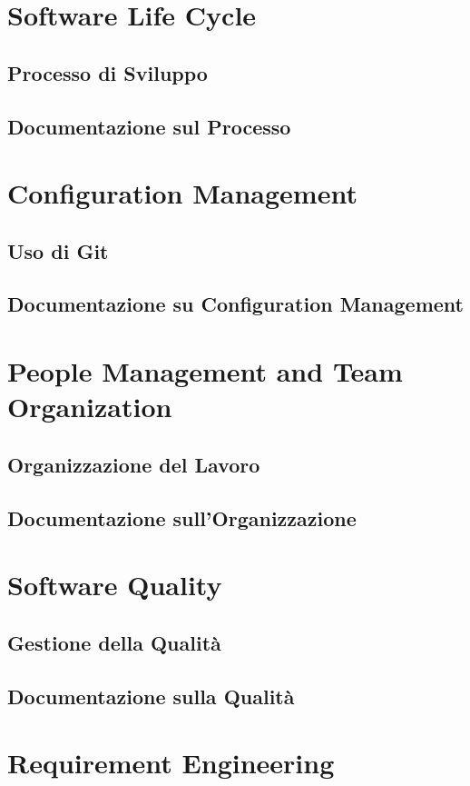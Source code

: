 \documentclass[a4paper,12pt]{article}
\begin{document}
\section{Software Life Cycle}
\subsection{Processo di Sviluppo}
\subsection{Documentazione sul Processo}

\section{Configuration Management}
\subsection{Uso di Git}
\subsection{Documentazione su Configuration Management}

\section{People Management and Team Organization}
\subsection{Organizzazione del Lavoro}
\subsection{Documentazione sull'Organizzazione}

\section{Software Quality}
\subsection{Gestione della Qualità}
\subsection{Documentazione sulla Qualità}

\section{Requirement Engineering}
\end{document}

